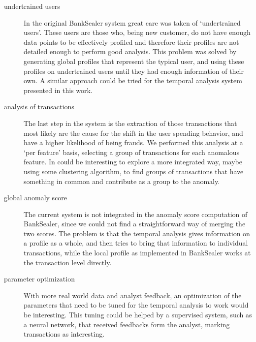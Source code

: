 \begin{description}
\item[undertrained users] In the original BankSealer system great care was taken of `undertrained users'. These users are those who, being new customer, do not have enough data points to be effectively profiled and therefore their profiles are not detailed enough to perform good analysis. This problem was solved by generating global profiles that represent the typical user, and using these profiles on undertrained users until they had enough information of their own. A similar approach could be tried for the temporal analysis system presented in this work.
\item[analysis of transactions] The last step in the system is the extraction of those transactions that most likely are the cause for the shift in the user spending behavior, and have a higher likelihood of being frauds. We performed this analysis at a `per feature' basis, selecting a group of transactions for each anomalous feature. In could be interesting to explore a more integrated way, maybe using some clustering algorithm, to find groups of transactions that have something in common and contribute as a group to the anomaly.
\item[global anomaly score] The current system is not integrated in the anomaly score computation of BankSealer, since we could not find a straightforward way of merging the two scores. The problem is that the temporal analysis gives information on a profile as a whole, and then tries to bring that information to individual transactions, while the local profile as implemented in BankSealer works at the transaction level directly.
\item[parameter optimization] With more real world data and analyst feedback, an optimization of the parameters that need to be tuned for the temporal analysis to work would be interesting. This tuning could be helped by a supervised system, such as a neural network, that received feedbacks form the analyst, marking transactions as interesting.
\end{description}
